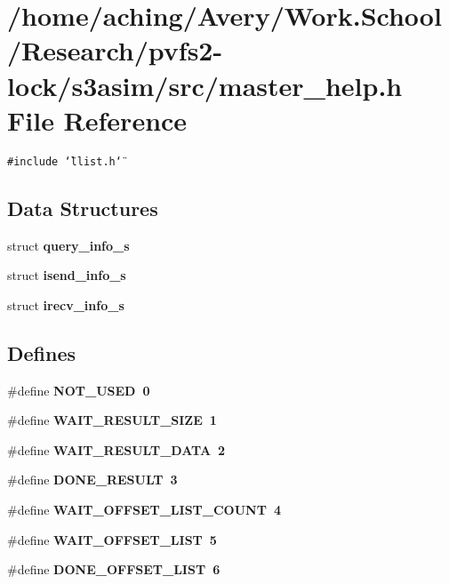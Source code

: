 \section{/home/aching/Avery/Work.School/Research/pvfs2-lock/s3asim/src/master\_\-help.h File Reference}
\label{master__help_8h}
{\tt \#include \char`\"{}llist.h\char`\"{}}\par
\subsection*{Data Structures}
\begin{CompactItemize}
\item 
struct \bf{query\_\-info\_\-s}
\item 
struct \bf{isend\_\-info\_\-s}
\item 
struct \bf{irecv\_\-info\_\-s}
\end{CompactItemize}
\subsection*{Defines}
\begin{CompactItemize}
\item 
\#define \bf{NOT\_\-USED}~0
\item 
\#define \bf{WAIT\_\-RESULT\_\-SIZE}~1
\item 
\#define \bf{WAIT\_\-RESULT\_\-DATA}~2
\item 
\#define \bf{DONE\_\-RESULT}~3
\item 
\#define \bf{WAIT\_\-OFFSET\_\-LIST\_\-COUNT}~4
\item 
\#define \bf{WAIT\_\-OFFSET\_\-LIST}~5
\item 
\#define \bf{DONE\_\-OFFSET\_\-LIST}~6
\end{CompactItemize}

